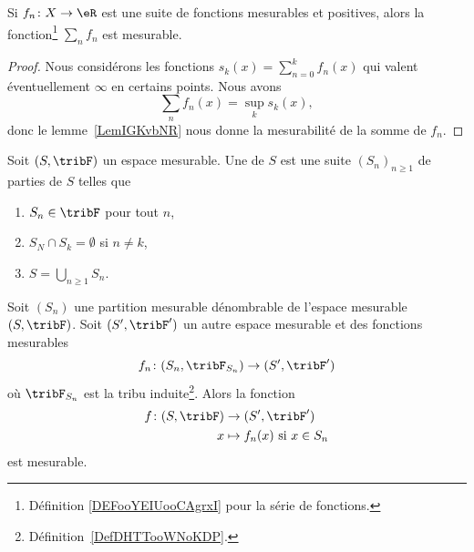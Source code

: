 \begin{proposition}\label{PropFYPEOIJ}
	Si \( f_n\colon X\to \eR\) est une suite de fonctions mesurables et positives, alors la fonction\footnote{Définition \ref{DEFooYEIUooCAgrxI} pour la série de fonctions.} \( \sum_nf_n\) est mesurable.
\end{proposition}

\begin{proof}
	Nous considérons les fonctions \( s_k(x)=\sum_{n=0}^kf_n(x)\) qui valent éventuellement \( \infty\) en certains points. Nous avons
	\begin{equation}
		\sum_nf_n(x)=\sup_ks_k(x),
	\end{equation}
	donc le lemme~\ref{LemIGKvbNR} nous donne la mesurabilité de la somme de \( f_n\).
\end{proof}

\begin{definition}      \label{ooUDHFooJjKscR}
	Soit \( (S,\tribF)\) un espace mesurable.
	Une  de \( S\) est une suite  \( (S_n)_{n\geq 1}\) de parties de \( S\) telles que
	\begin{enumerate}
		\item
		      \( S_n\in\tribF\) pour tout \( n\),
		\item
		      \( S_N\cap S_k=\emptyset\) si \( n\neq k\),
		\item
		      \( S=\bigcup_{n\geq 1}S_n\).
	\end{enumerate}
\end{definition}

\begin{lemma}     \label{LEMooXAPQooPpZUmP}
	Soit \( (S_n)\) une partition mesurable dénombrable de l'espace mesurable \( (S,\tribF)\). Soit \( (S',\tribF')\) un autre espace mesurable et des fonctions mesurables
	\begin{equation}
		f_n\colon (S_n,\tribF_{S_n})\to (S',\tribF')
	\end{equation}
	où \( \tribF_{S_n}\) est la tribu induite\footnote{Définition~\ref{DefDHTTooWNoKDP}.}. Alors la fonction
	\begin{equation}
		\begin{aligned}
			f\colon (S,\tribF) & \to (S',\tribF')                    \\
			x                  & \mapsto f_n(x) \text{ si } x\in S_n
		\end{aligned}
	\end{equation}
	est mesurable.
\end{lemma}


